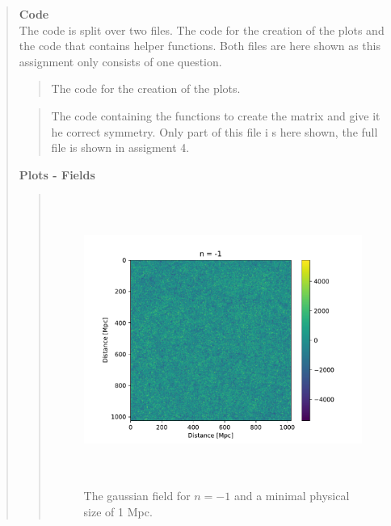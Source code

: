 \begin{quote}
\begin{quote}
\end{quote}
\newpage
\textbf{Code} \\
The code is split over two files. The code for the creation of the plots and the code that contains helper functions. Both files are here shown as this assignment only consists of one question.

\begin{quote}
The code for the creation of the plots.


\end{quote}

\begin{quote}
The code containing the functions to create the matrix and give it he correct
symmetry. Only part of this file i s here shown, the full file is shown in assigment 4.

\end{quote}
\newpage

\textbf{Plots - Fields}
\begin{quote}

\begin{figure}[!ht]
\centering
\includegraphics[width=14cm, height=9.5cm]{./Plots/2_field_-1.pdf}
\caption{The gaussian field for $n = -1$ and a minimal physical size of 1 Mpc.}
\end{figure}


\end{quote}
\end{quote}
